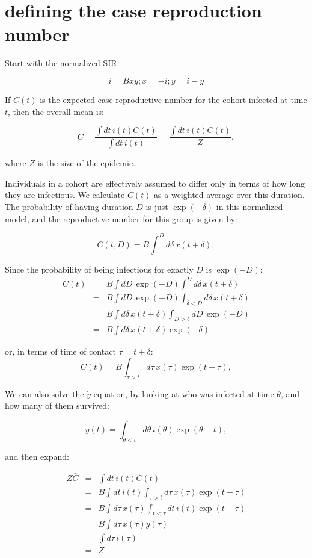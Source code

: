 \documentclass[12pt]{article}
\begin{document}
\section{defining the case reproduction number}
Start with the normalized SIR:

$$ i = Bxy; \dot x = -i; \dot y = i-y $$

If $C(t)$ is the expected case reproductive number for the cohort infected at time $t$, then the overall mean is:

$$
	\bar C
	= \frac{\int{dt\, i(t) C(t)}}{\int{dt\, i(t)}}
	= \frac{\int{dt\, i(t) C(t)}}{Z},
$$

where $Z$ is the size of the epidemic.

Individuals in a cohort are effectively assumed to differ only in terms of how long they are infectious. We calculate $C(t)$ as a weighted average over this duration. The probability of having duration $D$ is just $\exp(-\delta)$ in this normalized model, and the reproductive number for this group is given by:

$$C(t, D) = B \int^D{d\delta\, x(t+\delta)}, $$

Since the probability of being infectious for exactly $D$ is $\exp(-D)$:
\begin{eqnarray}
	C(t)
	&=& B \int{dD\, \exp(-D) \int^D{d\delta\, x(t+\delta)}}
	\\ &=& B \int{dD\, \exp(-D) \int_{\delta<D}{d\delta\, x(t+\delta)}}
	\\ &=& B \int{d\delta\, x(t+\delta)\int_{D>\delta}{dD\, \exp(-D) }}
	\\ &=& B \int{d\delta\, x(t+\delta) \exp(-\delta)}
\end{eqnarray}

or, in terms of time of contact $\tau=t+\delta$:
$$C(t) = B \int_{\tau>t}{d\tau\, x(\tau) \exp(t-\tau)}, $$

We can also solve the $\dot y$ equation, by looking at who was infected at time $\theta$, and how many of them survived:

$$ y(t) = \int_{\theta<t}{d\theta\, i(\theta)\exp(\theta-t)},$$

and then expand:

\begin{eqnarray}
	Z \bar C
	&=& \int{dt\, i(t) C(t)}
	\\ &=& B \int{dt\, i(t) \int_{\tau>t}{d\tau\, x(\tau) \exp(t-\tau)}}
	\\ &=& B \int{d\tau\, x(\tau) \int_{t<\tau}dt\, i(t) \exp(t-\tau)}
	\\ &=& B \int{d\tau\, x(\tau) y(\tau)}
	\\ &=& \int{d\tau\, i(\tau)}
	\\ &=& Z
\end{eqnarray}
\end{document}
